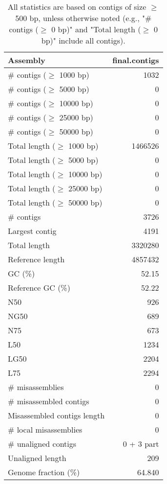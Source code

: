 \documentclass[12pt,a4paper]{article}
\begin{document}
\begin{table}[ht]
\begin{center}
\caption{All statistics are based on contigs of size $\geq$ 500 bp, unless otherwise noted (e.g., "\# contigs ($\geq$ 0 bp)" and "Total length ($\geq$ 0 bp)" include all contigs).}
\begin{tabular}{|l*{1}{|r}|}
\hline
Assembly & final.contigs \\ \hline
\# contigs ($\geq$ 1000 bp) & 1032 \\ \hline
\# contigs ($\geq$ 5000 bp) & 0 \\ \hline
\# contigs ($\geq$ 10000 bp) & 0 \\ \hline
\# contigs ($\geq$ 25000 bp) & 0 \\ \hline
\# contigs ($\geq$ 50000 bp) & 0 \\ \hline
Total length ($\geq$ 1000 bp) & 1466526 \\ \hline
Total length ($\geq$ 5000 bp) & 0 \\ \hline
Total length ($\geq$ 10000 bp) & 0 \\ \hline
Total length ($\geq$ 25000 bp) & 0 \\ \hline
Total length ($\geq$ 50000 bp) & 0 \\ \hline
\# contigs & 3726 \\ \hline
Largest contig & 4191 \\ \hline
Total length & 3320280 \\ \hline
Reference length & 4857432 \\ \hline
GC (\%) & 52.15 \\ \hline
Reference GC (\%) & 52.22 \\ \hline
N50 & 926 \\ \hline
NG50 & 689 \\ \hline
N75 & 673 \\ \hline
L50 & 1234 \\ \hline
LG50 & 2204 \\ \hline
L75 & 2294 \\ \hline
\# misassemblies & 0 \\ \hline
\# misassembled contigs & 0 \\ \hline
Misassembled contigs length & 0 \\ \hline
\# local misassemblies & 0 \\ \hline
\# unaligned contigs & 0 + 3 part \\ \hline
Unaligned length & 209 \\ \hline
Genome fraction (\%) & 64.840 \\ \hline

\end{tabular}
\end{center}
\end{table}
\end{document}
